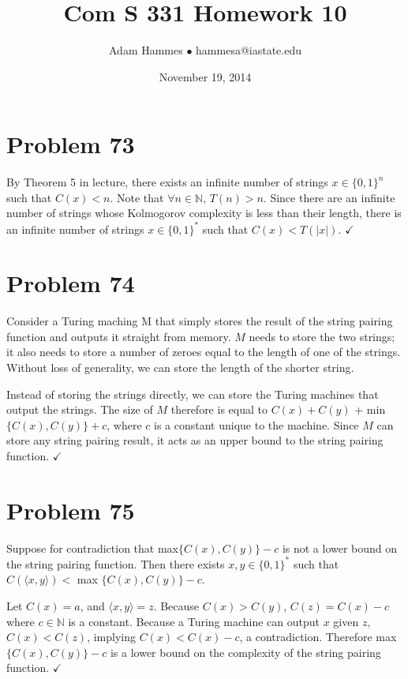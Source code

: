 \documentclass[11pt]{article}
\begin{document}
\title{Com S 331 Homework 10}
\author{Adam Hammes $\bullet$ hammesa@iastate.edu}
\date{November 19, 2014}
\maketitle

\section*{Problem 73}

By Theorem 5 in lecture, there exists an infinite number of strings $x \in \{0,1\}^n$ such that $C(x) < n$.
Note that $\forall n \in \mathbb{N}$, $T(n) > n$.
Since there are an infinite number of strings whose Kolmogorov complexity is less than their length, there is an infinite number of strings $x \in \{0,1\}^*$ such that $C(x) < T(|x|)$. $\checkmark$


\section*{Problem 74}

Consider a Turing maching M that simply stores the result of the string pairing function and outputs it straight from memory.
$M$ needs to store the two strings; it also needs to store a number of zeroes equal to the length of one of the strings.
Without loss of generality, we can store the length of the shorter string.

Instead of storing the strings directly, we can store the Turing machines that output the strings.
The size of $M$ therefore is equal to $C(x) + C(y)$ + min$\{C(x), C(y)\} + c$, where $c$ is a constant unique to the machine.
Since $M$ can store any string pairing result, it acts as an upper bound to the string pairing function. $\checkmark$


\section*{Problem 75}
 
Suppose for contradiction that max$\{C(x),C(y)\} -c $ is not a lower bound on the string pairing function.
Then there exists $x, y \in \{0,1\}^*$ such that $C( \langle x, y \rangle ) < $ max $\{C(x), C(y)\} -c$.

Let $C(x) = a$, and $\langle x, y \rangle = z$. Because $C(x) > C(y)$, $C(z) = C(x) -c$ where $c \in \mathbb{N}$ is a constant.
Because a Turing machine can output $x$ given $z$, $C(x) < C(z)$, implying $C(x) < C(x) -c$, a contradiction.
Therefore max$\{C(x),C(y)\} -c $ is a lower bound on the complexity of the string pairing function. $\checkmark$
\end{document}
